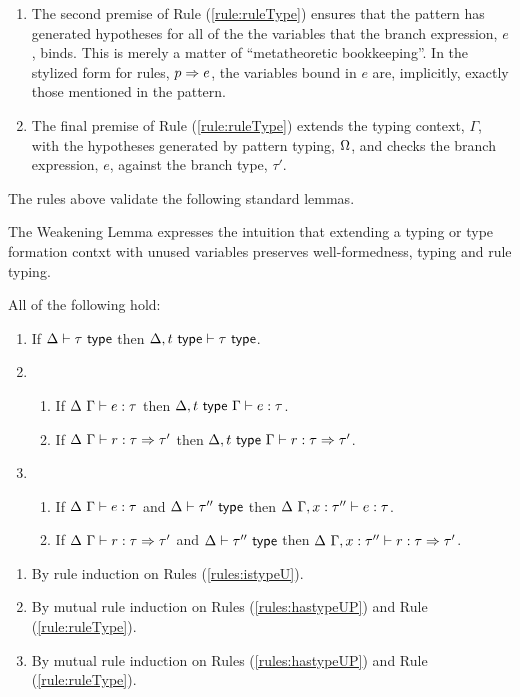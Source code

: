 {{{{\begin{enumerate}
\item The second premise of Rule (\ref{rule:ruleType}) ensures that the pattern has generated hypotheses for all of the the variables that the branch expression, $e$, binds. This is merely a matter of ``metatheoretic bookkeeping''. In the stylized form for rules, $p \Rightarrow e$, the variables bound in $e$ are, implicitly, exactly those mentioned in the pattern.%
\item The final premise of Rule (\ref{rule:ruleType}) extends the typing context, $\Gamma$, with the hypotheses generated by pattern typing, $\Omega$, and checks the branch expression, $e$, against the branch type, $\tau'$.
\end{enumerate}

The rules above validate the following standard lemmas.

The Weakening Lemma expresses the intuition that extending a typing or type formation contxt with unused variables preserves well-formedness, typing and rule typing.
\begin{lemma}[Weakening]\label{lemma:weakening-UP} All of the following hold: 
\begin{enumerate} 
\item If $\Delta \vdash \tau~\mathsf{type}$ then $\Delta, t~\mathsf{type} \vdash \tau~\mathsf{type}$.
\item \begin{enumerate}
  \item If $\Delta~\Gamma \vdash e : \tau$ then $\Delta, t~\mathsf{type}~\Gamma \vdash e : \tau$.
  \item If $\Delta~\Gamma \vdash r : \tau \Rightarrow \tau'$ then $\Delta, t~\mathsf{type}~\Gamma \vdash r : \tau \Rightarrow \tau'$.
  \end{enumerate}
\item \begin{enumerate}
  \item If $\Delta~\Gamma \vdash e : \tau$ and $\Delta \vdash \tau''~\mathsf{type}$ then $\Delta~\Gamma, x : \tau'' \vdash e : \tau$.
  \item If $\Delta~\Gamma \vdash r : \tau \Rightarrow \tau'$ and $\Delta \vdash \tau''~\mathsf{type}$ then $\Delta~\Gamma, x : \tau'' \vdash r : \tau \Rightarrow \tau'$.
  \end{enumerate}
\end{enumerate}
\end{lemma}
\begin{proof-sketch}
\begin{enumerate}
\item By rule induction on Rules (\ref{rules:istypeU}).
\item By mutual rule induction on Rules (\ref{rules:hastypeUP}) and Rule (\ref{rule:ruleType}).
\item By mutual rule induction on Rules (\ref{rules:hastypeUP}) and Rule (\ref{rule:ruleType}).
\end{enumerate}
\end{proof-sketch}

}}}}

